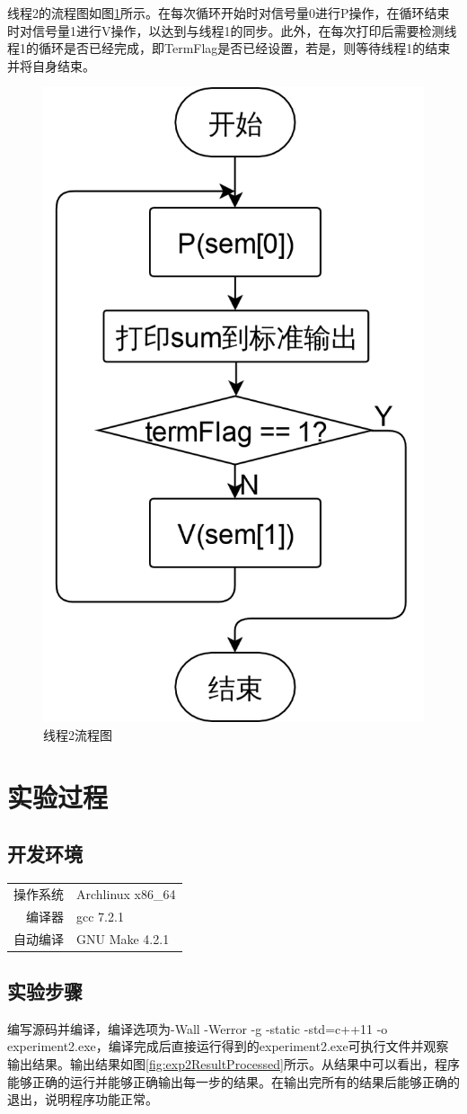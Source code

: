 \documentclass{report}
\begin{document}
线程2的流程图如图\ref{fig:exp2Thread2Flowchart}所示。在每次循环开始时对信号量0进行P操作，在循环结束时对信号量1进行V操作，以达到与线程1的同步。此外，在每次打印后需要检测线程1的循环是否已经完成，即TermFlag是否已经设置，若是，则等待线程1的结束并将自身结束。
\begin{figure}[H]
    \centering
    \includegraphics[width=0.28\linewidth]{exp2Thread2Flowchart.png}
    \caption{线程2流程图}
    \label{fig:exp2Thread2Flowchart}
\end{figure}

\section{实验过程}
\label{sec:shi_yan_guo_cheng_2}

\subsection{开发环境}
\label{sub:kai_fa_huan_jing_2}

\begin{tabular}{r l}
    操作系统 & Archlinux x86\_64 \\
    编译器 & gcc 7.2.1 \\
    自动编译 & GNU Make 4.2.1 \\
\end{tabular}

\subsection{实验步骤}
\label{sub:shi_yan_bu_zou_2}

编写源码并编译，编译选项为-Wall -Werror -g -static -std=c++11 -o experiment2.exe，编译完成后直接运行得到的experiment2.exe可执行文件并观察输出结果。输出结果如图\ref{fig:exp2ResultProcessed}所示。从结果中可以看出，程序能够正确的运行并能够正确输出每一步的结果。在输出完所有的结果后能够正确的退出，说明程序功能正常。
\end{document}
